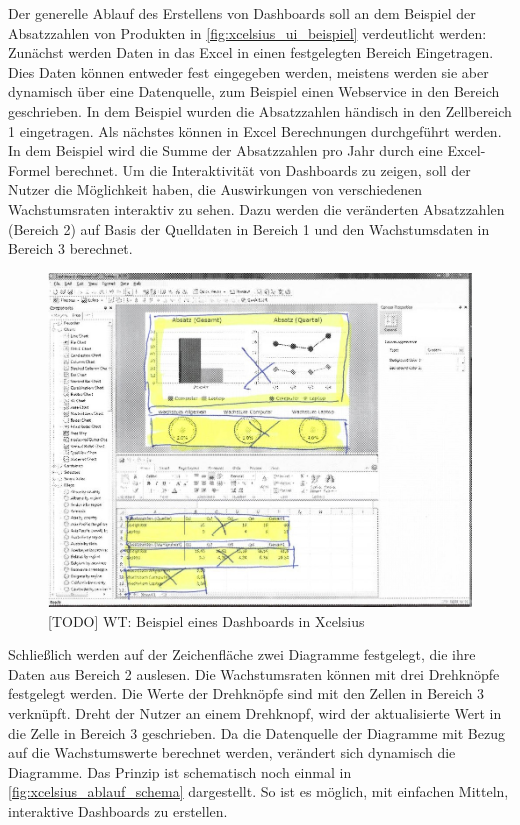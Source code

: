 \begin{onehalfspacing}

Der generelle Ablauf des Erstellens von Dashboards soll an dem Beispiel der Absatzzahlen von Produkten in \vref{fig:xcelsius_ui_beispiel} verdeutlicht werden: Zunächst werden Daten in das Excel in einen festgelegten Bereich Eingetragen. Dies Daten können entweder fest eingegeben werden, meistens werden sie aber dynamisch über eine Datenquelle, zum Beispiel einen Webservice in den Bereich geschrieben. In dem Beispiel wurden die Absatzzahlen händisch in den Zellbereich 1 eingetragen. Als nächstes können in Excel Berechnungen durchgeführt werden. In dem Beispiel wird die Summe der Absatzzahlen pro Jahr durch eine Excel-Formel berechnet. Um die Interaktivität von Dashboards zu zeigen, soll der Nutzer die Möglichkeit haben, die Auswirkungen von verschiedenen Wachstumsraten interaktiv zu sehen. Dazu werden die veränderten Absatzzahlen (Bereich 2) auf Basis der Quelldaten in Bereich 1 und den Wachstumsdaten in Bereich 3 berechnet.

\begin{figure}[h]
\centering
\setlength{\unitlength}{1mm}
\includegraphics[width=15cm]{images/Xcelsius_UI_Beispiel.jpg}
\caption{[TODO] WT: Beispiel eines Dashboards in Xcelsius\label{fig:xcelsius_ui_beispiel}}
\end{figure}

Schließlich werden auf der Zeichenfläche zwei Diagramme festgelegt, die ihre Daten aus Bereich 2 auslesen. Die Wachstumsraten können mit drei Drehknöpfe festgelegt werden. Die Werte der Drehknöpfe sind mit den Zellen in Bereich 3 verknüpft. Dreht der Nutzer an einem Drehknopf, wird der aktualisierte Wert in die Zelle in Bereich 3 geschrieben. Da die Datenquelle der Diagramme mit Bezug auf die Wachstumswerte berechnet werden, verändert sich dynamisch die Diagramme. Das Prinzip ist schematisch noch einmal in \vref{fig:xcelsius_ablauf_schema} dargestellt. So ist es möglich, mit einfachen Mitteln, interaktive Dashboards zu erstellen.


\end{onehalfspacing}
